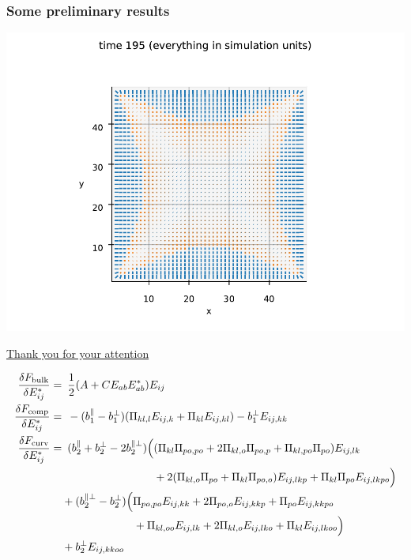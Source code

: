 \documentclass[10pt,mathserif]{beamer}
\begin{document}
\begin{frame}
    \frametitle{Some preliminary results}
    \begin{center}
        \includegraphics[width=\textwidth]{figures/prelim4.pdf}
    \end{center}
\end{frame}

\begin{frame}
    \vspace{4em}
    \begin{center}
        \LARGE
        \underline{Thank you for your attention}
    \end{center}
    \vspace{2em}
    \footnotesize
    \color{gray}
    \begin{align*}
        \fdv{F_\text{bulk}}{E_{ij}^*} =&\enspace \frac{1}{2}\qty(A + C E_{ab}E_{ab}^*)E_{ij} \\
        \fdv{F_\text{comp}}{E_{ij}^*} =&\enspace -(b_1^\parallel - b_1^\perp) (\Pi_{kl,l} E_{ij,k} + \Pi_{kl} E_{ij,kl}) - b_1^\perp E_{ij,kk} \\
        \fdv{F_\text{curv}}{E_{ij}^*} =&\enspace (b_2^\parallel + b_2^\perp - 2b_2^{\parallel\perp}) \Bigl( (\Pi_{kl}\Pi_{po,po} + 2\Pi_{kl,o}\Pi_{po,p} + \Pi_{kl,po}\Pi_{po})E_{ij,lk} \\
        &\phantom{\enspace (b_2^\parallel + b_2^\perp - 2b_2^{\parallel\perp}) \Bigl(}+ 2(\Pi_{kl,o}\Pi_{po} + \Pi_{kl}\Pi_{po,o})E_{ij,lkp} + \Pi_{kl}\Pi_{po}E_{ij,lkpo} \Bigr) \nonumber \\
        &+ (b_2^{\parallel\perp} - b_2^\perp)\Bigl( \Pi_{po,po}E_{ij,kk} + 2\Pi_{po,o}E_{ij,kkp} + \Pi_{po}E_{ij,kkpo} \nonumber \\ 
        &\phantom{\enspace+ (b_2^{\parallel\perp} - b_2^\perp)\Bigl(}+ \Pi_{kl,oo}E_{ij,lk} + 2\Pi_{kl,o}E_{ij,lko} + \Pi_{kl}E_{ij,lkoo} \Bigr) \nonumber \\ 
        &+ b_2^\perp E_{ij,kkoo} \nonumber
    \end{align*}
    \normalcolor\normalsize
\end{frame}
\end{document}
